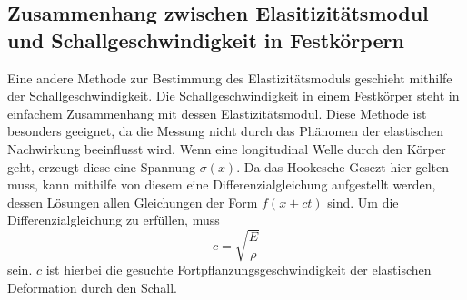 \subsection{Zusammenhang zwischen Elasitizitätsmodul und Schallgeschwindigkeit in Festkörpern}
Eine andere Methode zur Bestimmung des Elastizitätsmoduls geschieht mithilfe der Schallgeschwindigkeit.
Die Schallgeschwindigkeit in einem Festkörper steht in einfachem Zusammenhang mit dessen Elastizitätsmodul.
Diese Methode ist besonders geeignet, da die Messung nicht durch das Phänomen der elastischen Nachwirkung beeinflusst wird.
Wenn eine longitudinal Welle durch den Körper geht, erzeugt diese eine Spannung $\sigma (x)$.
Da das Hookesche Gesezt hier gelten muss, kann mithilfe von diesem eine Differenzialgleichung aufgestellt werden,
dessen Lösungen allen Gleichungen der Form $f(x \pm ct)$ sind.
Um die Differenzialgleichung zu erfüllen, muss
\begin{equation}
    c = \sqrt {\frac{E}{\rho}}
\end{equation}
sein.
$c$ ist hierbei die gesuchte Fortpflanzungsgeschwindigkeit der elastischen Deformation durch den Schall.
